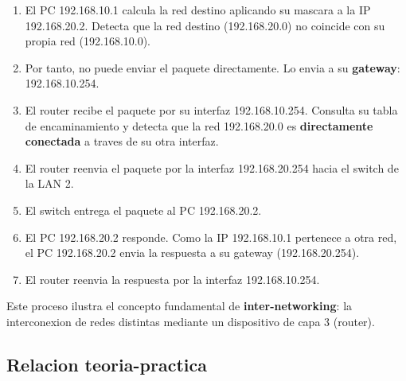 \begin{enumerate}
    \item El PC 192.168.10.1 calcula la red destino aplicando su mascara a la
    IP 192.168.20.2. Detecta que la red destino (192.168.20.0) no coincide
    con su propia red (192.168.10.0).
    \item Por tanto, no puede enviar el paquete directamente. Lo envia a su
    \textbf{gateway}: 192.168.10.254.
    \item El router recibe el paquete por su interfaz 192.168.10.254. Consulta
    su tabla de encaminamiento y detecta que la red 192.168.20.0 es
    \textbf{directamente conectada} a traves de su otra interfaz.
    \item El router reenvia el paquete por la interfaz 192.168.20.254 hacia el
    switch de la LAN 2.
    \item El switch entrega el paquete al PC 192.168.20.2.
    \item El PC 192.168.20.2 responde. Como la IP 192.168.10.1 pertenece a otra
    red, el PC 192.168.20.2 envia la respuesta a su gateway (192.168.20.254).
    \item El router reenvia la respuesta por la interfaz 192.168.10.254.
\end{enumerate}

Este proceso ilustra el concepto fundamental de \textbf{inter-networking}: la
interconexion de redes distintas mediante un dispositivo de capa 3 (router).

\subsection{Relacion teoria-practica}

